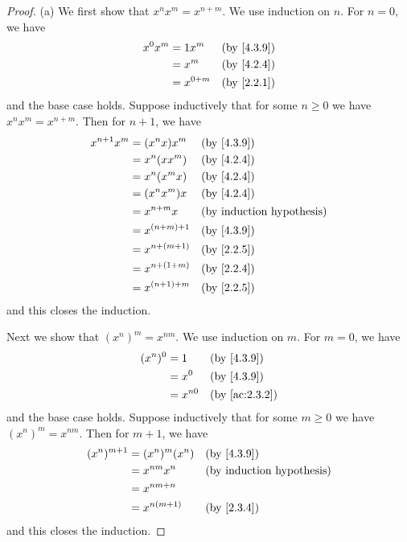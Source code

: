 \begin{proof}{(a)}
  We first show that \(x^n x^m = x^{n + m}\).
  We use induction on \(n\).
  For \(n = 0\), we have
  \begin{align*}
    x^0 x^m & = 1 x^m     &  & \text{(by \cref{4.3.9})} \\
            & = x^m       &  & \text{(by \cref{4.2.4})} \\
            & = x^{0 + m} &  & \text{(by \cref{2.2.1})}
  \end{align*}
  and the base case holds.
  Suppose inductively that for some \(n \geq 0\) we have \(x^n x^m = x^{n + m}\).
  Then for \(n + 1\), we have
  \begin{align*}
    x^{n + 1} x^m & = (x^n x) x^m     &  & \text{(by \cref{4.3.9})}         \\
                  & = x^n (x x^m)     &  & \text{(by \cref{4.2.4})}         \\
                  & = x^n (x^m x)     &  & \text{(by \cref{4.2.4})}         \\
                  & = (x^n x^m) x     &  & \text{(by \cref{4.2.4})}         \\
                  & = x^{n + m} x     &  & \text{(by induction hypothesis)} \\
                  & = x^{(n + m) + 1} &  & \text{(by \cref{4.3.9})}         \\
                  & = x^{n + (m + 1)} &  & \text{(by \cref{2.2.5})}         \\
                  & = x^{n + (1 + m)} &  & \text{(by \cref{2.2.4})}         \\
                  & = x^{(n + 1) + m} &  & \text{(by \cref{2.2.5})}
  \end{align*}
  and this closes the induction.

  Next we show that \((x^n)^m = x^{nm}\).
  We use induction on \(m\).
  For \(m = 0\), we have
  \begin{align*}
    (x^n)^0 & = 1      &  & \text{(by \cref{4.3.9})}    \\
            & = x^0    &  & \text{(by \cref{4.3.9})}    \\
            & = x^{n0} &  & \text{(by \cref{ac:2.3.2})}
  \end{align*}
  and the base case holds.
  Suppose inductively that for some \(m \geq 0\) we have \((x^n)^m = x^{nm}\).
  Then for \(m + 1\), we have
  \begin{align*}
    (x^n)^{m + 1} & = (x^n)^m (x^n) &  & \text{(by \cref{4.3.9})}         \\
                  & = x^{nm} x^n    &  & \text{(by induction hypothesis)} \\
                  & = x^{nm + n}                                          \\
                  & = x^{n(m + 1)}  &  & \text{(by \cref{2.3.4})}
  \end{align*}
  and this closes the induction.


\end{proof}
